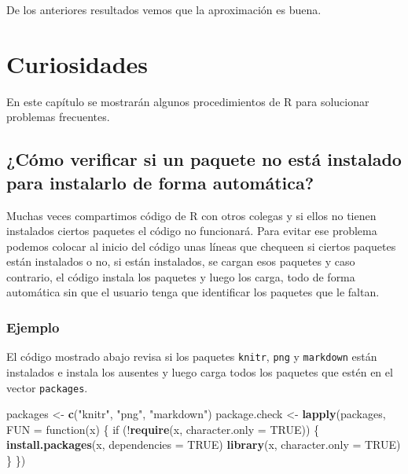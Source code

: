 \documentclass[10pt,]{krantz}
\makeatletter
\newenvironment{Shaded}{\begin{snugshade}}{\end{snugshade}}
\newcommand{\KeywordTok}[1]{\textcolor[rgb]{0.13,0.29,0.53}{\textbf{{#1}}}}
\newcommand{\DataTypeTok}[1]{\textcolor[rgb]{0.13,0.29,0.53}{{#1}}}
\newcommand{\StringTok}[1]{\textcolor[rgb]{0.31,0.60,0.02}{{#1}}}
\newcommand{\OtherTok}[1]{\textcolor[rgb]{0.56,0.35,0.01}{{#1}}}
\newcommand{\NormalTok}[1]{{#1}}
\let\proglang=\textsf
\newenvironment{kframe}{%
\medskip{}
\setlength{\fboxsep}{.8em}
 \def\at@end@of@kframe{}%
 \ifinner\ifhmode%
  \def\at@end@of@kframe{\end{minipage}}%
  \begin{minipage}{\columnwidth}%
 \fi\fi%
 \def\FrameCommand##1{\hskip\@totalleftmargin \hskip-\fboxsep
 \colorbox{shadecolor}{##1}\hskip-\fboxsep
     \hskip-\linewidth \hskip-\@totalleftmargin \hskip\columnwidth}%
 \MakeFramed {\advance\hsize-\width
   \@totalleftmargin\z@ \linewidth\hsize
   \@setminipage}}%
 {\par\unskip\endMakeFramed%
 \at@end@of@kframe}
\renewenvironment{Shaded}{\begin{kframe}}{\end{kframe}}
\makeatother
\begin{document}
De los anteriores resultados vemos que la aproximación es buena.

\chapter{\texorpdfstring{Curiosidades
\label{curio}}{Curiosidades }}\label{curiosidades}

En este capítulo se mostrarán algunos procedimientos de \proglang{R}
para solucionar problemas frecuentes.

\section{¿Cómo verificar si un paquete no está instalado para instalarlo
de forma
automática?}\label{como-verificar-si-un-paquete-no-esta-instalado-para-instalarlo-de-forma-automatica}

Muchas veces compartimos código de \proglang{R} con otros colegas y si
ellos no tienen instalados ciertos paquetes el código no funcionará.
Para evitar ese problema podemos colocar al inicio del código unas
líneas que chequeen si ciertos paquetes están instalados o no, si están
instalados, se cargan esos paquetes y caso contrario, el código instala
los paquetes y luego los carga, todo de forma automática sin que el
usuario tenga que identificar los paquetes que le faltan.

\subsection*{Ejemplo}\label{ejemplo-72}


El código mostrado abajo revisa si los paquetes \texttt{knitr},
\texttt{png} y \texttt{markdown} están instalados e instala los ausentes
y luego carga todos los paquetes que estén en el vector
\texttt{packages}.

\begin{Shaded}
\begin{Highlighting}[]
\NormalTok{packages <-}\StringTok{  }\KeywordTok{c}\NormalTok{(}\StringTok{"knitr"}\NormalTok{, }\StringTok{"png"}\NormalTok{, }\StringTok{"markdown"}\NormalTok{)}
\NormalTok{package.check <-}\StringTok{ }\KeywordTok{lapply}\NormalTok{(packages, }\DataTypeTok{FUN =} \NormalTok{function(x) \{}
  \NormalTok{if (!}\KeywordTok{require}\NormalTok{(x, }\DataTypeTok{character.only =} \OtherTok{TRUE}\NormalTok{)) \{}
    \KeywordTok{install.packages}\NormalTok{(x, }\DataTypeTok{dependencies =} \OtherTok{TRUE}\NormalTok{)}
    \KeywordTok{library}\NormalTok{(x, }\DataTypeTok{character.only =} \OtherTok{TRUE}\NormalTok{)}
  \NormalTok{\}}
\NormalTok{\})}
\end{Highlighting}
\end{Shaded}



\backmatter
\printindex
\end{document}
